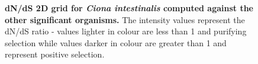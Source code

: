 \documentclass{article}
\begin{document}
\begin{figure}[H]
\centering
{}
\caption{\textbf{dN/dS 2D grid for \textit{Ciona intestinalis} computed against the other significant organisms.} The intensity values represent the dN/dS ratio - values lighter in colour are less than 1 and purifying selection while values darker in colour are greater than 1 and represent positive selection.}
\label{sup_fig_21}
\end{figure}
\end{document}
